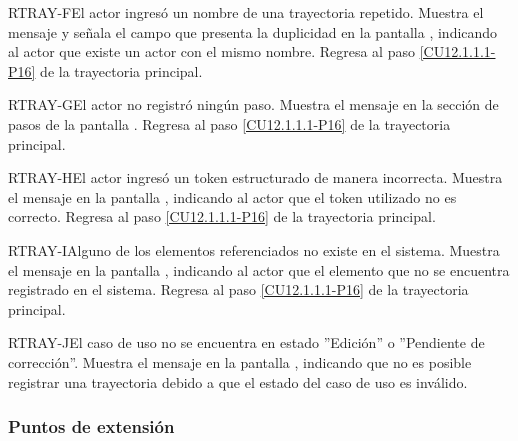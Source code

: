 	\begin{UCtrayectoriaA}{RTRAY-F}{El actor ingresó un nombre de una trayectoria repetido.}
		\UCpaso[\UCsist] Muestra el mensaje  y señala el campo que presenta la duplicidad en la pantalla , indicando al actor que existe un actor con el mismo nombre.
		\UCpaso Regresa al paso \ref{CU12.1.1.1-P16} de la trayectoria principal.
	\end{UCtrayectoriaA}

	\begin{UCtrayectoriaA}{RTRAY-G}{El actor no registró ningún paso.}
		\UCpaso[\UCsist] Muestra el mensaje  en la sección de pasos de la pantalla .
		\UCpaso Regresa al paso \ref{CU12.1.1.1-P16} de la trayectoria principal.
	\end{UCtrayectoriaA}

	\begin{UCtrayectoriaA}{RTRAY-H}{El actor ingresó un token estructurado de manera incorrecta.}
		\UCpaso[\UCsist] Muestra el mensaje  en la pantalla , indicando al actor que el token utilizado no es correcto.
		\UCpaso Regresa al paso \ref{CU12.1.1.1-P16} de la trayectoria principal.
	\end{UCtrayectoriaA}
	
	\begin{UCtrayectoriaA}{RTRAY-I}{Alguno de los elementos referenciados no existe en el sistema.}
		\UCpaso[\UCsist] Muestra el mensaje  en la pantalla , indicando al actor que el elemento que no se encuentra registrado en el sistema.
		\UCpaso Regresa al paso \ref{CU12.1.1.1-P16} de la trayectoria principal.
	\end{UCtrayectoriaA}

	\begin{UCtrayectoriaA}{RTRAY-J}{El caso de uso no se encuentra en estado ''Edición'' o ''Pendiente de corrección''.}
		\UCpaso[\UCsist] Muestra el mensaje  en la pantalla , indicando que no es posible registrar una trayectoria debido a que el estado del caso de uso es inválido.
	\end{UCtrayectoriaA}


\subsubsection{Puntos de extensión}

